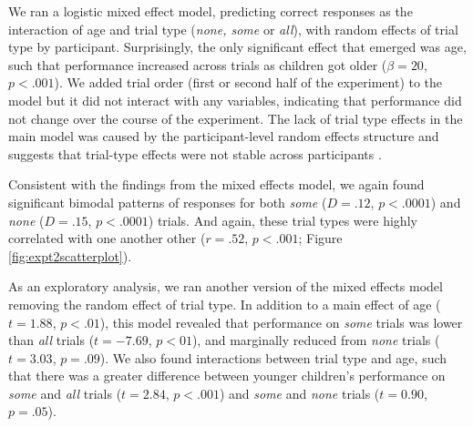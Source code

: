 \documentclass[10pt,letterpaper]{article}
\begin{document}
We ran a logistic mixed effect model, predicting correct responses as the interaction of age and trial type (\emph{none, some} or \emph{all}), with random effects of trial type by participant. Surprisingly, the only significant effect that emerged was age, such that performance increased across trials as children got older ($\beta = 20$, $p <.001$). We added trial order (first or second half of the experiment) to the model but it did not interact with any variables, indicating that performance did not change over the course of the experiment.  The lack of trial type effects in the main model was caused by the participant-level random effects structure and suggests that trial-type effects were not stable across participants \cite{barr2013}. 

Consistent with the findings from the mixed effects model, we again found significant bimodal patterns of responses for both \emph{some} ($D=.12$, $p<.0001$) and \emph{none} ($D=.15$, $p<.0001$) trials. And again, these trial types were highly correlated with one another other ($r=.52$, $p<.001$; Figure \ref{fig:expt2scatterplot}). 

As an exploratory analysis, we ran another version of the mixed effects model removing the random effect of trial type. In addition to a main effect of age ($t = 1.88$, $p<.01$), this model revealed that performance on \emph{some} trials was lower than \emph{all} trials ($t = -7.69$, $p<01$), and marginally reduced from \emph{none} trials ($t = 3.03$, $p=.09$). We also found interactions between trial type and age, such that there was a greater difference between younger children's performance on \emph{some} and \emph{all} trials ($t=2.84$, $p<.001$) and \emph{some} and \emph{none} trials ($t=0.90$, $p=.05$).

\end{document}
